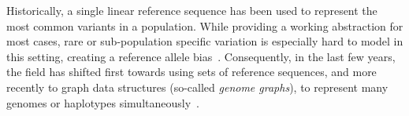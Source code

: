 Historically, a single linear reference sequence has been used to represent the
most common variants in a population. While providing a working abstraction for
most cases, rare or sub-population specific variation is especially hard to
model in this setting, creating a reference allele
bias~\cite{stevenson_sources_2013,brandt_mapping_2015}. Consequently, in the
last few years, the field has shifted first towards using sets of reference
sequences, and more recently to graph data structures (so-called {\em genome
graphs}), to represent many genomes or haplotypes
simultaneously~\cite{dilthey_improved_2015,paten_genome_2017,garrison_variation_2018}.
